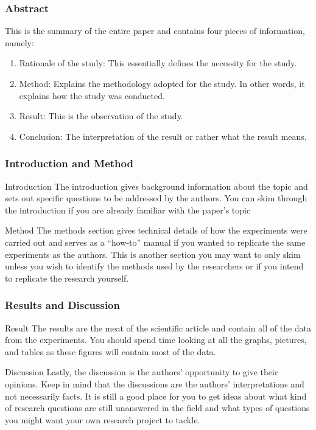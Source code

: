 \documentclass[11pt,xcolor={dvipsnames},hyperref={pdftex,pdfpagemode=UseNone,hidelinks,pdfdisplaydoctitle=true},usepdftitle=false]{beamer}
\begin{document}
\begin{frame}
	\frametitle{Abstract}
	This is the summary of the entire paper and contains four pieces of information, namely:
	\begin{enumerate}
		\item Rationale of the study:  This essentially defines the necessity for the study.
		\item Method: Explains the methodology adopted for the study. In other words, it explains how the study was conducted.
		\item Result: This is the observation of the study.
		\item Conclusion: The interpretation of the result or rather what the result means.
	\end{enumerate}
\end{frame}

\begin{frame}
	\frametitle{Introduction and Method}
	\begin{block}{Introduction}
		The introduction gives background information about the topic and sets out specific questions to be addressed by the authors. You can skim through the introduction if you are already familiar with the paper’s topic
	\end{block}
	\begin{block}{Method}
		The methods section gives technical details of how the experiments were carried out and serves as a “how-to” manual if you wanted to replicate the same experiments as the authors. This is another section you may want to only skim unless you wish to identify the methods used by the researchers or if you intend to replicate the research yourself.
	\end{block}
\end{frame}

\begin{frame}
	\frametitle{Results and Discussion}
	\begin{block}{Result}
		The results are the meat of the scientific article and contain all of the data from the experiments. You should spend time looking at all the graphs, pictures, and tables as these figures will contain most of the data.
	\end{block}
	\begin{block}{Discussion}
		Lastly, the discussion is the authors’ opportunity to give their opinions. Keep in mind that the discussions are the authors’ interpretations and not necessarily facts. It is still a good place for you to get ideas about what kind of research questions are still unanswered in the field and what types of questions you might want your own research project to tackle. 
	\end{block}
\end{frame}
\end{document}
